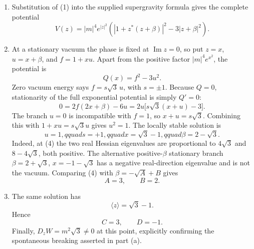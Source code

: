 \begin{enumerate}
\begin{enumerate}
    \item Substitution of (1) into the supplied supergravity formula gives
      the complete potential
      \[
        \boxed{V(z)=|m|^4e^{|z|^2}
          \left(\left|1+z^*(z+\beta)\right|^2
                -3|z+\beta|^2\right)}.
      \tag{3}
      \]

    \item At a stationary vacuum the phase is fixed at
      \(\operatorname{Im}z=0\), so put \(z=x\),
      \(u=x+\beta\), and \(f=1+xu\).  Apart from the positive factor
      \(|m|^4e^{x^2}\), the potential is
      \[
        Q(x)=f^2-3u^2.
      \]
      Zero vacuum energy says \(f=s\sqrt3\,u\), with \(s=\pm1\).
      Because \(Q=0\), stationarity of the full exponential potential is
      simply \(Q'=0\):
      \[
        0=2f(2x+\beta)-6u
          =2u\bigl[s\sqrt3(x+u)-3\bigr].
      \]
      The branch \(u=0\) is incompatible with \(f=1\), so
      \(x+u=s\sqrt3\).  Combining this with
      \(1+xu=s\sqrt3u\) gives \(u^2=1\).  The locally stable solution is
      \[
        u=1,qquad s=+1,qquad
        x=\sqrt3-1,qquad
        \beta=2-\sqrt3.
      \tag{4}
      \]
      Indeed, at (4) the two real Hessian eigenvalues are proportional to
      \(4\sqrt3\) and \(8-4\sqrt3\), both positive.  The alternative
      positive-\(\beta\) stationary branch
      \(\beta=2+\sqrt3\), \(x=-1-\sqrt3\) has a negative real-direction
      eigenvalue and is not the vacuum.  Comparing (4) with
      \(\beta=-\sqrt A+B\) gives
      \[
        \boxed{A=3,\qquad B=2.}
      \]

    \item The same solution has
      \[
        \langle z\rangle=\sqrt3-1.
      \]
      Hence
      \[
        \boxed{C=3,\qquad D=-1.}
      \]
      Finally,
      \(D_zW=m^2\sqrt3\ne0\) at this point, explicitly confirming the
      spontaneous breaking asserted in part (a).
  \end{enumerate}

\end{enumerate}
